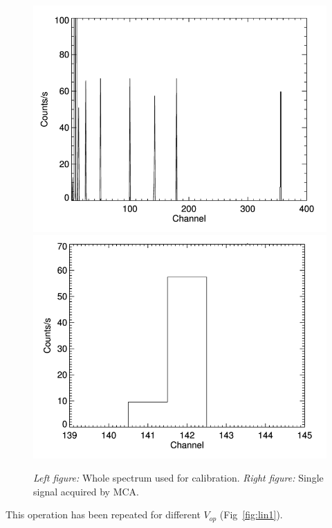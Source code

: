 \documentclass[10pt,a4paper, openany]{book}
\begin{document}
\begin{figure}[!h]
\begin{center}
\includegraphics[scale=0.3]{imm/w1.png}
\includegraphics[scale=0.3]{imm/w2.png}
\end{center}
\caption{\emph{Left figure:} Whole spectrum used for calibration. \emph{Right figure:} Single signal acquired by MCA.}
\label{fig:w}
\end{figure}
This operation has been repeated for different $V_{op}$ (Fig~\ref{fig:lin1}).
\end{document}
